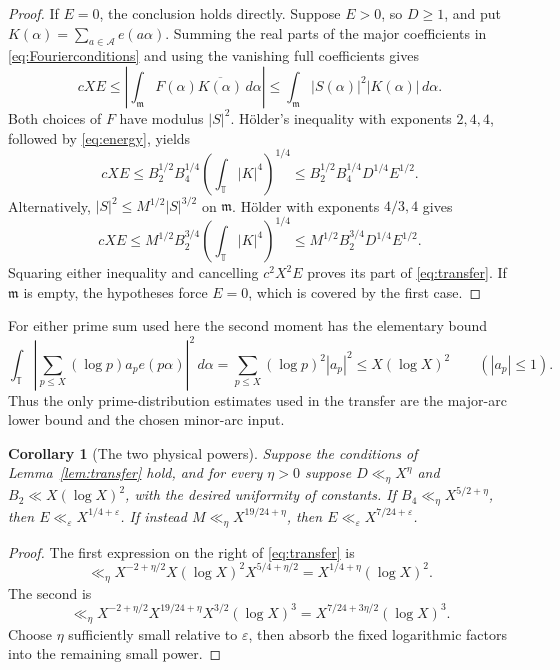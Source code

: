 \documentclass[11pt]{article}
\newtheorem{corollary}[theorem]{Corollary}
\theoremstyle{definition}
\theoremstyle{remark}
\numberwithin{equation}{section}
\newcommand{\eps}{\varepsilon}
\newcommand{\T}{\mathbb T}
\newcommand{\m}{\mathfrak m}
\newcommand{\A}{\mathcal A}
\newcommand{\abs}[1]{\left\lvert#1\right\rvert}
\begin{document}
\begin{proof}
If $E=0$, the conclusion holds directly. Suppose $E>0$, so $D\ge1$,
and put $K(\alpha)=\sum_{a\in\A}e(a\alpha)$. Summing the real parts
of the major coefficients in \eqref{eq:Fourierconditions} and using
the vanishing full coefficients gives
\begin{equation}\label{eq:basictransfer}
 cXE\le\abs{\int_\m F(\alpha)\overline{K(\alpha)}\,d\alpha}
              \le\int_\m|S(\alpha)|^2|K(\alpha)|\,d\alpha.
\end{equation}
Both choices of $F$ have modulus $|S|^2$. H\"older's inequality with
exponents $2,4,4$, followed by \eqref{eq:energy}, yields
\[
 cXE\le B_2^{1/2}B_4^{1/4}
                  \left(\int_\T|K|^4\right)^{1/4}
        \le B_2^{1/2}B_4^{1/4}D^{1/4}E^{1/2}.
\]
Alternatively, $|S|^2\le M^{1/2}|S|^{3/2}$ on $\m$. H\"older
with exponents $4/3,4$ gives
\[
 cXE\le M^{1/2}B_2^{3/4}
                  \left(\int_\T|K|^4\right)^{1/4}
        \le M^{1/2}B_2^{3/4}D^{1/4}E^{1/2}.
\]
Squaring either inequality and cancelling $c^2X^2E$ proves its part
of \eqref{eq:transfer}. If $\m$ is empty, the hypotheses force
$E=0$, which is covered by the first case.
\end{proof}

For either prime sum used here the second moment has the elementary
bound
\begin{equation}\label{eq:secondmoment}
 \int_\T\abs{\sum_{p\le X}(\log p)a_pe(p\alpha)}^2\,d\alpha
 =\sum_{p\le X}(\log p)^2|a_p|^2
 \le X(\log X)^2\qquad(|a_p|\le1).
\end{equation}
Thus the only prime-distribution estimates used in the transfer are
the major-arc lower bound and the chosen minor-arc input.

\begin{corollary}[The two physical powers]\label{cor:physical}
Suppose the conditions of Lemma~\ref{lem:transfer} hold, and for
every $\eta>0$ suppose $D\ll_\eta X^\eta$ and
$B_2\ll X(\log X)^2$, with the desired uniformity of constants.
If $B_4\ll_\eta X^{5/2+\eta}$, then
$E\ll_\eps X^{1/4+\eps}$. If instead
$M\ll_\eta X^{19/24+\eta}$, then
$E\ll_\eps X^{7/24+\eps}$.
\end{corollary}

\begin{proof}
The first expression on the right of \eqref{eq:transfer} is
\[
 \ll_\eta X^{-2+\eta/2}X(\log X)^2 X^{5/4+\eta/2}
        =X^{1/4+\eta}(\log X)^2.
\]
The second is
\[
 \ll_\eta X^{-2+\eta/2}X^{19/24+\eta}
                  X^{3/2}(\log X)^3
        =X^{7/24+3\eta/2}(\log X)^3.
\]
Choose $\eta$ sufficiently small relative to $\eps$, then absorb
the fixed logarithmic factors into the remaining small power.
\end{proof}
\end{document}
